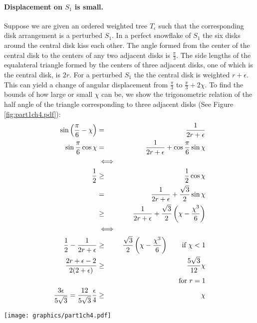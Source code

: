 \paragraph{Displacement on $S_1$ is small.}
Suppose we are given an ordered weighted tree $T_\epsilon$ such that the corresponding disk arrangement is a perturbed $S_1$.  
In a perfect snowflake of $S_1$ the six disks around the central disk kiss each other.  
The angle formed from the center of the central disk to the centers of any two adjacent disks is $\frac{\pi}{3}$.  
The side lengths of the equalateral triangle formed by the centers of three adjacent disks, one of which is the central disk, is $2r$.  
For a perturbed $S_1$ the the central disk is weighted $r+ \epsilon$.  
This can yield a change of angular displacement from $\frac{\pi}{3}$ to $\frac{\pi}{3} + 2\chi$.  
To find the bounds of how large or small $\chi$ can be, we show the trigonometric relation of the half angle of the triangle corresponding to three adjacent disks (See Figure \ref{fig:part1ch4.pdf}):
\begin{eqnarray*}
\sin \left( \frac{\pi}{6} - \chi \right) &=& \frac{1}{2r+\epsilon}\\
\sin \frac{\pi}{6} \cos \chi &=& \frac{1}{2r+\epsilon} + \cos \frac{\pi}{6} \sin \chi\\
&\iff&\\
\frac{1}{2} &\geq& \frac{1}{2} \cos \chi \\
&=& \frac{1}{2r+\epsilon} + \frac{\sqrt{3}}{2} \sin \chi\\
&\geq& \frac{1}{2r+\epsilon} + \frac{\sqrt{3}}{2} \left(  \chi - \frac{\chi^3}{6} \right)\\
&\iff&\\
\frac{1}{2}-\frac{1}{2r+\epsilon} &\geq& \frac{\sqrt{3}}{2} \left(  \chi - \frac{\chi^3}{6} \right) \qquad \text{if }\chi < 1\\
\frac{2r + \epsilon - 2}{2 ( 2 + \epsilon)} &\geq&  \frac{5\sqrt{3}}{12} \chi\\
&&\text{for $r=1$}\\
\frac{3 \epsilon}{5\sqrt{3}}=\frac{12}{5\sqrt{3}} \frac{\epsilon}{4} &\geq& \chi
\end{eqnarray*}

\begin{minipage}{\linewidth}
\begin{center}
\texttt{[image: graphics/part1ch4.pdf]}
\label{fig:part1ch4.pdf}
\end{center}
\end{minipage}

